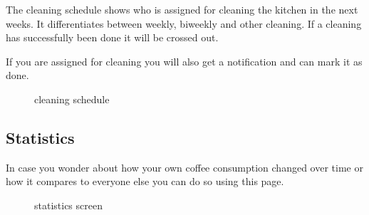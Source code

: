 The cleaning schedule shows who is assigned for cleaning the kitchen in
the next weeks. It differentiates between weekly, biweekly and other
cleaning. If a cleaning has successfully been done it will be crossed
out.

If you are assigned for cleaning you will also get a notification and
can mark it as done.

\begin{figure}[htbp]
\centering
{}
\caption{cleaning schedule}
\end{figure}

\subsection{Statistics}\label{statistics-2}

In case you wonder about how your own coffee consumption changed over
time or how it compares to everyone else you can do so using this page.

\begin{figure}[htbp]
\centering
{}
\caption{statistics screen}
\end{figure}

